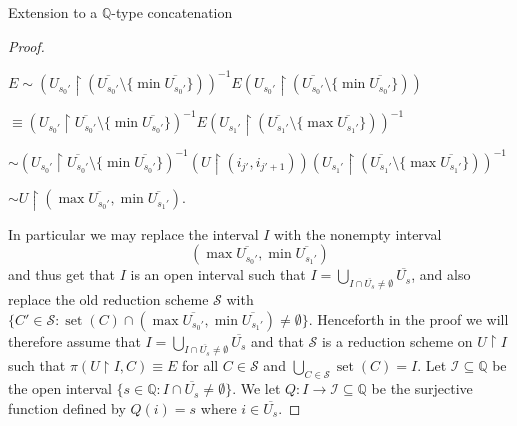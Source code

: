 \documentclass{amsart}
\theoremstyle{definition}\newtheorem{theorem}{Theorem}
\theoremstyle{definition}\newtheorem*{A}{Main Theorem}
\theoremstyle{definition}\newtheorem*{B}{Theorem \ref{elementaryequiv}}
\theoremstyle{definition}\newtheorem*{C}{Theorem \ref{continuous}}
\theoremstyle{definition}\newtheorem*{D}{Theorem \ref{bigisomorphism2}}
\theoremstyle{definition}\newtheorem{bigtheorem}{Main Theorem}
\numberwithin{theorem}{section}
\theoremstyle{definition}\newtheorem{corollary}[theorem]{Corollary}
\theoremstyle{definition}\newtheorem{proposition}[theorem]{Proposition}
\theoremstyle{definition}\newtheorem{definition}[theorem]{Definition}
\theoremstyle{definition}\newtheorem{question}[theorem]{Question}
\theoremstyle{definition}\newtheorem{example}[theorem]{Example}
\theoremstyle{definition}\newtheorem{remark}[theorem]{Remark}
\theoremstyle{definition}\newtheorem{note}[theorem]{Note}
\theoremstyle{definition}\newtheorem{lemma}[theorem]{Lemma}
\theoremstyle{definition}\newtheorem{fact}[theorem]{Fact}
\theoremstyle{definition}\newtheorem{define}[theorem]{Definition}
\theoremstyle{definition}\newtheorem{claim}[theorem]{Claim}
\theoremstyle{definition}\newtheorem{obs}[theorem]{Observation}
\theoremstyle{definition}\newtheorem{definitions}[theorem]{Definitions}
\newcommand{\set}{\operatorname{set}}
\begin{document}
\begin{section}{Extension to a $\mathbb{Q}$-type concatenation}
\begin{proof}
\begin{center}

$E \sim (U_{s_0'}\upharpoonright (\overline{U_{s_0'}} \setminus \{\min\overline{U_{s_0'}}\}))^{-1} E (U_{s_0'}\upharpoonright (\overline{U_{s_0'}} \setminus \{\min\overline{U_{s_0'}}\}))$

$\equiv (U_{s_0'}\upharpoonright \overline{U_{s_0'}} \setminus \{\min\overline{U_{s_0'}}\})^{-1} E (U_{s_1'}\upharpoonright( \overline{U_{s_1'}} \setminus \{\max\overline{U_{s_1'}}\}))^{-1}$

$\sim  (U_{s_0'}\upharpoonright \overline{U_{s_0'}} \setminus \{\min\overline{U_{s_0'}}\})^{-1} (U\upharpoonright (i_{j'}, i_{j'+1})) (U_{s_1'}\upharpoonright( \overline{U_{s_1'}} \setminus \{\max\overline{U_{s_1'}}\}))^{-1}$

$\sim U\upharpoonright (\max\overline{U_{s_0'}}, \min\overline{U_{s_1'}})$.


\end{center}

\noindent  In particular we may replace the interval $I$ with the nonempty interval $$(\max\overline{U_{s_0'}}, \min\overline{U_{s_1'}})$$ and thus get that $I$ is an open interval such that $I = \bigcup_{I \cap \overline{U_s} \neq \emptyset} \overline{U_s}$, and also replace the old reduction scheme $\mathcal{S}$ with $\{C' \in \mathcal{S}: \set(C) \cap (\max\overline{U_{s_0'}}, \min\overline{U_{s_1'}}) \neq \emptyset\}$.  Henceforth in the proof we will therefore assume that $I = \bigcup_{I \cap \overline{U_s} \neq \emptyset} \overline{U_s}$ and that $\mathcal{S}$ is a reduction scheme on $U\upharpoonright I$ such that $\pi(U \upharpoonright I, C) \equiv E$ for all $C \in \mathcal{S}$ and $\bigcup_{C\in \mathcal{S}}\set(C) = I$.  Let $\mathcal{I} \subseteq \mathbb{Q}$ be the open interval $\{s \in \mathbb{Q}: I \cap \overline{U_s} \neq \emptyset\}$.  We let $Q: I \rightarrow \mathcal{I} \subseteq \mathbb{Q}$ be the surjective function defined by $Q(i)= s$ where $i \in \overline{U_s}$.




\end{proof}
\end{section}
\end{document}
